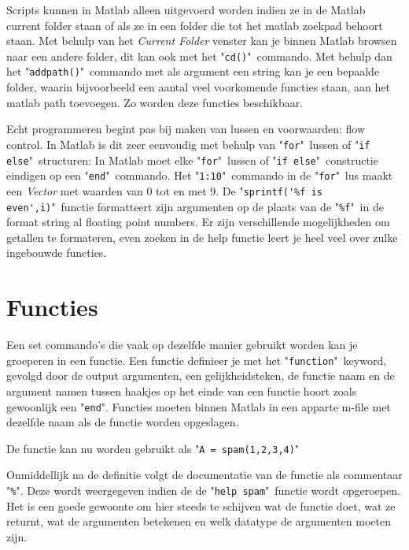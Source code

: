 \documentclass[11pt,twoside]{article}
\begin{document}
Scripts kunnen in Matlab alleen uitgevoerd worden indien ze in de Matlab current folder staan of als ze in een folder die tot het matlab zoekpad behoort staan. Met behulp van het \emph{Current Folder} venster kan je binnen Matlab browsen naar een andere folder, dit kan ook met het "\lstinline{cd()}"\ commando. Met behulp dan het "\lstinline{addpath()}"\ commando met als argument een string kan je een bepaalde folder, waarin bijvoorbeeld een aantal veel voorkomende functies staan, aan het matlab path toevoegen. Zo worden deze functies beschikbaar.

Echt programmeren begint pas bij maken van lussen en voorwaarden: flow control. In Matlab is dit zeer eenvoudig met behulp van "\lstinline{for}"\ lussen of "\lstinline{if else}"\ structuren:
 In Matlab moet elke "\lstinline{for}"\ lussen of "\lstinline{if else}"\ constructie eindigen op een "\lstinline{end}"\ commando.
Het "\lstinline{1:10}"\ commando in de "\lstinline{for}"\ lus maakt een \emph{Vector} met waarden van 0 tot en met 9. De "\lstinline{sprintf('%f is even',i)}"\ functie formatteert zijn argumenten op de plaats van de "\lstinline{%f}"\ in de format string al floating point numbers. Er zijn verschillende mogelijkheden om getallen te formateren, even zoeken in de help functie leert je heel veel over zulke ingebouwde functies.

	\section{Functies}
Een set commando's die vaak op dezelfde manier gebruikt worden kan je groeperen in een functie. Een functie definieer je met het "\lstinline{function}"\ keyword, gevolgd door de output argumenten, een gelijkheidsteken, de functie naam en de argument namen tussen haakjes op het einde van een functie hoort zoals gewoonlijk een "\lstinline{end}". Functies moeten binnen Matlab in een apparte m-file met dezelfde naam als de functie worden opgeslagen.


De functie kan nu worden gebruikt als "\lstinline{A = spam(1,2,3,4)}"\

Onmiddellijk na de definitie volgt de documentatie van de functie als commentaar "\lstinline{%}". Deze wordt weergegeven indien de de "\lstinline{help spam}"\ functie wordt opgeroepen. Het is een goede gewoonte om hier steeds te schijven wat de functie doet, wat ze returnt, wat de argumenten betekenen en welk datatype de argumenten moeten zijn.
\end{document}
